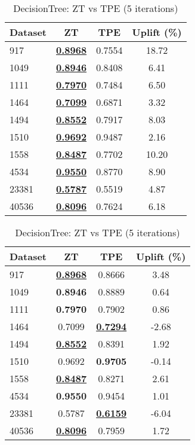 \begin{table}[htbp]
\begin{center}
\begin{small}
\begin{sc}
\begin{subtable}[t]{0.48\textwidth}
    \centering
    \caption{DecisionTree: ZT vs TPE (1 iteration)}
    \label{tab:decisiontree-zt-vs-tpe-1}
    \begin{tabular}{lccc}
    \toprule
    \textbf{Dataset} & \textbf{ZT} & \textbf{TPE} & \textbf{Uplift (\%)} \\
    \midrule
    917    & \underline{\textbf{0.8968}} & 0.7554 & 18.72 \\
    1049    & \underline{\textbf{0.8946}} & 0.8408 & 6.41 \\
    1111    & \underline{\textbf{0.7970}} & 0.7484 & 6.50 \\
    1464    & \underline{\textbf{0.7099}} & 0.6871 & 3.32 \\
    1494    & \underline{\textbf{0.8552}} & 0.7917 & 8.03 \\
    1510    & \underline{\textbf{0.9692}} & 0.9487 & 2.16 \\
    1558    & \underline{\textbf{0.8487}} & 0.7702 & 10.20 \\
    4534    & \underline{\textbf{0.9550}} & 0.8770 & 8.90 \\
    23381    & \underline{\textbf{0.5787}} & 0.5519 & 4.87 \\
    40536    & \underline{\textbf{0.8096}} & 0.7624 & 6.18 \\
    \bottomrule
    \end{tabular}
\end{subtable}
\hfill
\begin{subtable}[t]{0.48\textwidth}
    \centering
    \caption{DecisionTree: ZT vs TPE (5 iterations)}
    \label{tab:decisiontree-zt-vs-tpe-5}
    \begin{tabular}{lccc}
    \toprule
    \textbf{Dataset} & \textbf{ZT} & \textbf{TPE} & \textbf{Uplift (\%)} \\
    \midrule
    917    & \underline{\textbf{0.8968}} & 0.8666 & 3.48 \\
    1049    & \textbf{0.8946} & 0.8889 & 0.64 \\
    1111    & \textbf{0.7970} & 0.7902 & 0.86 \\
    1464    & 0.7099 & \underline{\textbf{0.7294}} & -2.68 \\
    1494    & \underline{\textbf{0.8552}} & 0.8391 & 1.92 \\
    1510    & 0.9692 & \textbf{0.9705} & -0.14 \\
    1558    & \underline{\textbf{0.8487}} & 0.8271 & 2.61 \\
    4534    & \textbf{0.9550} & 0.9454 & 1.01 \\
    23381    & 0.5787 & \underline{\textbf{0.6159}} & -6.04 \\
    40536    & \underline{\textbf{0.8096}} & 0.7959 & 1.72 \\
    \bottomrule
    \end{tabular}
\end{subtable}


\end{sc}
\end{small}
\end{center}
\end{table}
